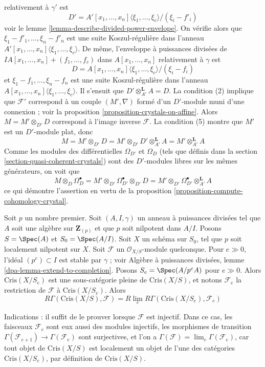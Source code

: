 \begin{remark}
relativement à $\gamma'$ est
$$
D' = A'[x_1, \ldots, x_n]\langle \xi_1, \ldots, \xi_c \rangle/(\xi_i - f'_i)
$$
voir le lemme \ref{lemma-describe-divided-power-envelope}. On vérifie alors que
$\xi_1 - f'_1, \ldots, \xi_n - f'_n$ est une suite Koszul-régulière dans
l'anneau $A'[x_1, \ldots, x_n]\langle \xi_1, \ldots, \xi_c\rangle$.
De même, l'enveloppe à puissances divisées de
$IA[x_1, \ldots, x_n] + (f_1, \ldots, f_c)$ dans $A[x_1, \ldots, x_n]$
relativement à $\gamma$ est
$$
D = A[x_1, \ldots, x_n]\langle \xi_1, \ldots, \xi_c\rangle/(\xi_i - f_i)
$$
et $\xi_1 - f_1, \ldots, \xi_n - f_n$ est une suite Koszul-régulière dans
l'anneau $A[x_1, \ldots, x_n]\langle \xi_1, \ldots, \xi_c\rangle$.
Il s'ensuit que $D' \otimes_{A'}^\mathbf{L} A = D$. La condition (2)
implique que $\mathcal{F}'$ correspond à un couple $(M', \nabla)$
formé d'un $D'$-module muni d'une connexion ; voir la
proposition \ref{proposition-crystals-on-affine}.
Alors $M = M' \otimes_{D'} D$ correspond à l'image inverse $\mathcal{F}$.
La condition (5) montre que $M'$ est un $D'$-module plat, donc
$$
M = M' \otimes_{D'} D = M' \otimes_{D'} D' \otimes_{A'}^\mathbf{L} A
= M' \otimes_{A'}^\mathbf{L} A
$$
Comme les modules des différentielles $\Omega_{D'}$ et $\Omega_D$
(tels que définis dans la section \ref{section-quasi-coherent-crystals})
sont des $D'$-modules libres sur les mêmes générateurs, on voit que
$$
M \otimes_D \Omega^\bullet_D =
M' \otimes_{D'} \Omega^\bullet_{D'} \otimes_{D'} D =
M' \otimes_{D'} \Omega^\bullet_{D'} \otimes_{A'}^\mathbf{L} A
$$
ce qui démontre l'assertion en vertu de la
proposition \ref{proposition-compute-cohomology-crystal}.
\end{remark}

\begin{remark}[Rlim]
\label{remark-rlim}
Soit $p$ un nombre premier. Soit $(A, I, \gamma)$ un anneau à puissances
divisées tel que $A$ soit une algèbre sur $\mathbf{Z}_{(p)}$ et que $p$ soit nilpotent
dans $A/I$. Posons $S = \Spec(A)$ et $S_0 = \Spec(A/I)$.
Soit $X$ un schéma sur $S_0$, tel que $p$ soit localement
nilpotent sur $X$. Soit $\mathcal{F}$ un
$\mathcal{O}_{X/S}$-module quelconque. Pour $e \gg 0$, l'idéal $(p^e) \subset I$
est stable par $\gamma$ ; voir
Algèbre à puissances divisées, lemme \ref{dpa-lemma-extend-to-completion}.
Posons $S_e = \Spec(A/p^eA)$ pour $e \gg 0$.
Alors $\text{Cris}(X/S_e)$ est une sous-catégorie pleine de $\text{Cris}(X/S)$,
et notons $\mathcal{F}_e$ la restriction de $\mathcal{F}$ à
$\text{Cris}(X/S_e)$. Alors
$$
R\Gamma(\text{Cris}(X/S), \mathcal{F}) =
R\lim_e R\Gamma(\text{Cris}(X/S_e), \mathcal{F}_e)
$$

\medskip\noindent
Indications : il suffit de le prouver lorsque $\mathcal{F}$ est injectif.
Dans ce cas, les faisceaux $\mathcal{F}_e$ sont eux aussi des
modules injectifs, les morphismes de transition
$\Gamma(\mathcal{F}_{e + 1}) \to \Gamma(\mathcal{F}_e)$ sont
surjectives, et l'on a
$\Gamma(\mathcal{F}) = \lim_e \Gamma(\mathcal{F}_e)$, car
tout objet de $\text{Cris}(X/S)$ est localement un objet de l'une
des catégories $\text{Cris}(X/S_e)$, par définition de
$\text{Cris}(X/S)$.
\end{remark}

